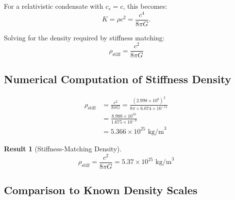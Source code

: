 \documentclass[11pt,a4paper]{article}
\newcommand{\ee}[1]{\times 10^{#1}}
\newcommand{\rhostiff}{\ensuremath{\rho_{\mathrm{stiff}}}}
\newtheorem{result}{Result}
\theoremstyle{definition}
\begin{document}
For a relativistic condensate with $c_s = c$, this becomes:
\begin{equation}
\label{eq:K_stiffness}
K = \rho c^2 = \frac{c^4}{8\pi G}.
\end{equation}

Solving for the density required by stiffness matching:
\begin{equation}
\label{eq:rho_stiffness}
\boxed{\rhostiff = \frac{c^2}{8\pi G}}
\end{equation}

\subsection{Numerical Computation of Stiffness Density}
\label{sec:rho_stiff_calc}

\begin{align}
\rhostiff &= \frac{c^2}{8\pi G} = \frac{(2.998 \ee{8})^2}{8\pi \times 6.674 \ee{-11}} \nonumber \\
&= \frac{8.988 \ee{16}}{1.675 \ee{-9}} \nonumber \\
&= 5.366 \ee{25} \text{ kg/m}^3
\end{align}

\begin{result}[Stiffness-Matching Density]
\begin{equation}
\boxed{\rhostiff = \frac{c^2}{8\pi G} = 5.37 \times 10^{25} \text{ kg/m}^3}
\end{equation}
\end{result}

\subsection{Comparison to Known Density Scales}
\label{sec:density_comparison}
\end{document}
